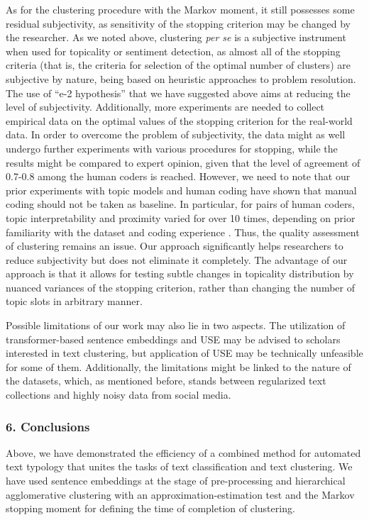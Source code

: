 As for the clustering procedure with the Markov moment, it still possesses some residual subjectivity, as sensitivity of the stopping criterion may be changed by the researcher. As we noted above, clustering \textit{per se} is a subjective instrument when used for topicality or sentiment detection, as almost all of the stopping criteria (that is, the criteria for selection of the optimal number of clusters) are subjective by nature, being based on heuristic approaches to problem resolution. The use of “e-2 hypothesis” that we have suggested above aims at reducing the level of subjectivity. Additionally, more experiments are needed to collect empirical data on the optimal values of the stopping criterion for the real-world data. In order to overcome the problem of subjectivity, the data might as well undergo further experiments with various procedures for stopping, while the results might be compared to expert opinion, given that the level of agreement of 0.7-0.8 among the human coders is reached. However, we need to note that our prior experiments with topic models and human coding have shown that manual coding should not be taken as baseline. In particular, for pairs of human coders, topic interpretability and proximity varied for over 10 times, depending on prior familiarity with the dataset and coding experience \cite{BlekanovBodrunovaZhuravleva}. Thus, the quality assessment of clustering remains an issue. Our approach significantly helps researchers to reduce subjectivity but does not eliminate it completely. The advantage of our approach is that it allows for testing subtle changes in topicality distribution by nuanced variances of the stopping criterion, rather than changing the number of topic slots in arbitrary manner.

Possible limitations of our work may also lie in two aspects. The utilization of transformer-based sentence embeddings and USE may be advised to scholars interested in text clustering, but application of USE may be technically unfeasible for some of them. Additionally, the limitations might be linked to the nature of the datasets, which, as mentioned before, stands between regularized text collections and highly noisy data from social media.

\subsubsection{6. Conclusions}


Above, we have demonstrated the efficiency of a combined method for automated text typology that unites the tasks of text classification and text clustering. We have used sentence embeddings at the stage of pre-processing and hierarchical agglomerative clustering with an approximation-estimation test and the Markov stopping moment for defining the time of completion of clustering.

